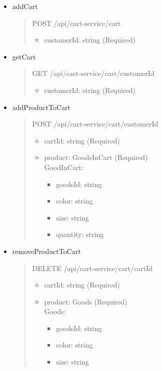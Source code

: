 \begin{itemize}
	\item addCart
	      \begin{quote}
		      POST /api/cart-service/cart
		      \begin{itemize}
			      \item customerId: string (Required)
		      \end{itemize}
	      \end{quote}

	\item getCart
	      \begin{quote}
		      GET /api/cart-service/cart/{customerId}
		      \begin{itemize}
			      \item customerId: string (Required)
		      \end{itemize}
	      \end{quote}

	\item addProductToCart
	      \begin{quote}
		      POST /api/cart-service/cart/{customerId}
		      \begin{itemize}
			      \item cartId: string (Required)
			      \item product: GoodsInCart (Required)\\
							GoodInCart:
							\begin{itemize}
								\item goodsId: string 
								\item color: string 
								\item size: string 
								\item quantity: string 
							\end{itemize}
		      \end{itemize}
	      \end{quote}

	\item removeProductToCart
	      \begin{quote}
		      DELETE /api/cart-service/cart/{cartId}
		      \begin{itemize}
			      \item cartId: string (Required)
			      \item product: Goods (Required)\\
							Goods:
							\begin{itemize}
								\item goodsId: string 
								\item color: string 
								\item size: string
							\end{itemize}
		      \end{itemize}
	      \end{quote}


\end{itemize}
